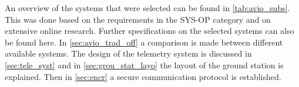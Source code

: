 An overview of the systems that were selected can be found in \autoref{tab:avio_subs}. This was done based on the requirements in the SYS-OP category %
and on extensive online research. Further specifications on the selected systems can also be found here. In \autoref{sec:avio_trad_off} a comparison is made between different available systems. The design of the telemetry system is discussed in \autoref{sec:tele_syst} and in \autoref{sec:grou_stat_layo} the layout of the ground station is explained. Then in \autoref{sec:encr} a secure communication protocol is established. 


